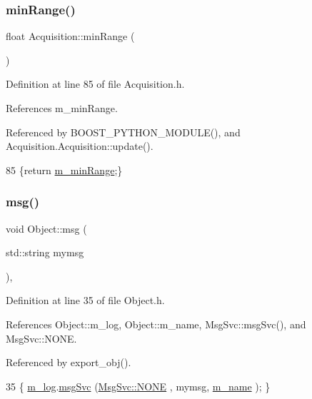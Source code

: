 \subsubsection{\texorpdfstring{min\+Range()}{minRange()}\hspace{0.1cm}{\footnotesize\ttfamily [2/2]}}
{\footnotesize\ttfamily float Acquisition\+::min\+Range (\begin{DoxyParamCaption}{ }\end{DoxyParamCaption})\hspace{0.3cm}{\ttfamily [inline]}}



Definition at line 85 of file Acquisition.\+h.



References m\+\_\+min\+Range.



Referenced by B\+O\+O\+S\+T\+\_\+\+P\+Y\+T\+H\+O\+N\+\_\+\+M\+O\+D\+U\+L\+E(), and Acquisition.\+Acquisition\+::update().


\begin{DoxyCode}
85 \{\textcolor{keywordflow}{return} \hyperlink{classAcquisition_a06b3ea027ebdcb15f64a6517ceb99b76}{m\_minRange};\}
\end{DoxyCode}
\mbox{\label{classObject_a58b2d0618c2d08cf2383012611528d97}} 
\subsubsection{\texorpdfstring{msg()}{msg()}\hspace{0.1cm}{\footnotesize\ttfamily [1/2]}}
{\footnotesize\ttfamily void Object\+::msg (\begin{DoxyParamCaption}\item[{std\+::string}]{mymsg }\end{DoxyParamCaption})\hspace{0.3cm}{\ttfamily [inline]}, {\ttfamily [inherited]}}



Definition at line 35 of file Object.\+h.



References Object\+::m\+\_\+log, Object\+::m\+\_\+name, Msg\+Svc\+::msg\+Svc(), and Msg\+Svc\+::\+N\+O\+NE.



Referenced by export\+\_\+obj().


\begin{DoxyCode}
35 \{ \hyperlink{classObject_a0d269813dd7ac1f24bc143031e2963f2}{m\_log}.\hyperlink{classMsgSvc_ad25f18047920cc59a314e5098259711c}{msgSvc} (\hyperlink{classMsgSvc_ae671eb7301996cd049d2da8a65925926a9be9ae32fed8e1e6eba4a58692210fbd}{MsgSvc::NONE}    , mymsg, \hyperlink{classObject_a8b83c95c705d2c3ba0d081fe1710f48d}{m\_name} ); \}
\end{DoxyCode}
\mbox{\label{classObject_ac5d59299273cee27aacf7de00d2e7034}} 
